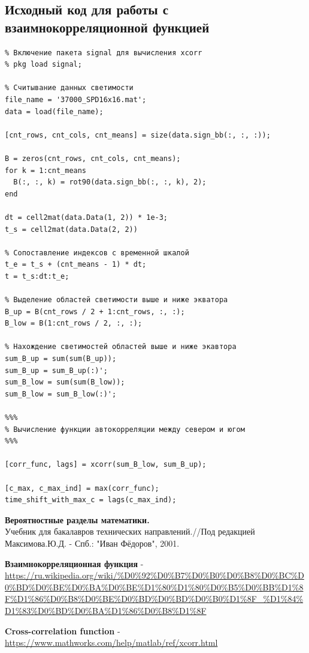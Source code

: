 \documentclass[12pt]{article}
\begin{document}
\subsection{Исходный код для работы с взаимнокорреляционной функцией}
\begin{verbatim}
% Включение пакета signal для вычисления xcorr
% pkg load signal;

% Считывание данных светимости
file_name = '37000_SPD16x16.mat';
data = load(file_name);

[cnt_rows, cnt_cols, cnt_means] = size(data.sign_bb(:, :, :));

B = zeros(cnt_rows, cnt_cols, cnt_means);
for k = 1:cnt_means
  B(:, :, k) = rot90(data.sign_bb(:, :, k), 2);
end

dt = cell2mat(data.Data(1, 2)) * 1e-3;
t_s = cell2mat(data.Data(2, 2))

% Сопоставление индексов с временной шкалой
t_e = t_s + (cnt_means - 1) * dt;
t = t_s:dt:t_e;  

% Выделение областей светимости выше и ниже экватора
B_up = B(cnt_rows / 2 + 1:cnt_rows, :, :);
B_low = B(1:cnt_rows / 2, :, :);

% Нахождение светимостей областей выше и ниже экавтора
sum_B_up = sum(sum(B_up));
sum_B_up = sum_B_up(:)';
sum_B_low = sum(sum(B_low));
sum_B_low = sum_B_low(:)';

%%%
% Вычисление функции автокорреляции между севером и югом
%%%

[corr_func, lags] = xcorr(sum_B_low, sum_B_up);

[c_max, c_max_ind] = max(corr_func);
time_shift_with_max_c = lags(c_max_ind);
\end{verbatim} \cite{doc}


\begin{thebibliography}{}
    \textbf{Вероятностные разделы математики.} \\
    Учебник для бакалавров технических направлений.//Под редакцией Максимова.Ю.Д. - Спб.: "Иван Фёдоров", 2001.
    
    \textbf{Взаимнокорреляционная функция} - 
    \url{https://ru.wikipedia.org/wiki/%D0%92%D0%B7%D0%B0%D0%B8%D0%BC%D0%BD%D0%BE%D0%BA%D0%BE%D1%80%D1%80%D0%B5%D0%BB%D1%8F%D1%86%D0%B8%D0%BE%D0%BD%D0%BD%D0%B0%D1%8F_%D1%84%D1%83%D0%BD%D0%BA%D1%86%D0%B8%D1%8F}
    
    \textbf{Cross-correlation function} - 
	\url{https://www.mathworks.com/help/matlab/ref/xcorr.html}    
      
\end{thebibliography}
\end{document}
